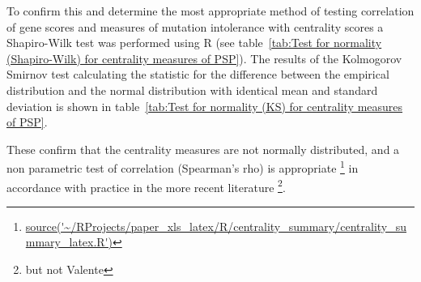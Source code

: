 


To confirm this and determine the most appropriate method of testing correlation of gene scores and measures of mutation intolerance with centrality scores a Shapiro-Wilk test was performed using R (see table~\ref{tab:Test for normality (Shapiro-Wilk) for centrality measures of PSP}). The results of the Kolmogorov Smirnov test calculating the statistic for the difference between the empirical distribution and the normal distribution with identical mean and standard deviation is shown in table~\ref{tab:Test for normality (KS) for centrality measures of PSP}.

These confirm that the centrality measures are not normally distributed, and a non parametric test of correlation (Spearman's rho) is appropriate \footnote{\url{source('~/RProjects/paper_xls_latex/R/centrality_summary/centrality_summary_latex.R')}} in accordance with practice in the more recent literature \cite{oldham2019consistency}\footnote{but not Valente\cite{valente2008correlated}}.


